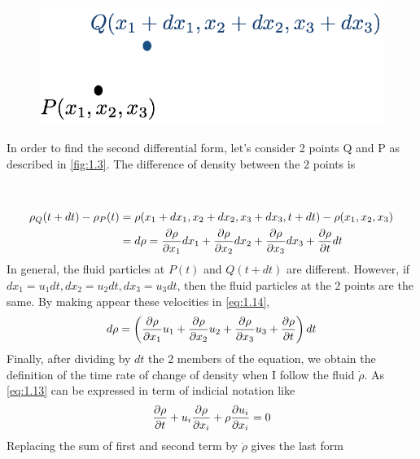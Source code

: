 	\begin{figure}
	\vspace{-5mm}
	\includegraphics[scale=0.35]{ch1/3}
	\label{fig:1.3}
	\end{figure}
	In order to find the second differential form, let's consider 2 points Q and P as described in \autoref{fig:1.3}. The difference of density between the 2 points is \\\\\\
	\begin{equation}
	\begin{aligned}
		\rho _Q(t+dt) - \rho _P(t) &= \rho (x_1+dx_1,x_2+dx_2,x_3+dx_3,t+dt) - \rho (x_1,x_2,x_3)  \\
		&= d\rho = \frac{\D \rho}{\D x_1}dx_1 + \frac{\D \rho}{\D x_2}dx_2 + \frac{\D \rho}{\D x_3}dx_3 + \frac{\D \rho}{\D t}dt
		\end{aligned}
		\label{eq:1.14}
	\end{equation}
	In general, the fluid particles at $P(t)$ and $Q(t+dt)$ are different. However, if $dx_1 = u_1 dt, dx_2 = u_2 dt, dx_3 = u_3 dt$, then the fluid particles at the 2 points are the same. By making appear these velocities in \autoref{eq:1.14}, 
	\begin{equation}
		d\rho = \left( \frac{\D \rho}{\D x_1}u_1 + \frac{\D \rho}{\D x_2}u_2 + \frac{\D \rho}{\D x_3}u_3 + \frac{\D \rho}{\D t}\right) dt
	\end{equation}
	Finally, after dividing by $dt$ the 2 members of the equation, we obtain the definition of the time rate of change of density when I follow the fluid $\dot{\rho}$. As \autoref{eq:1.13} can be expressed in term of indicial notation like 
	\begin{equation}
		\frac{\D \rho}{\D t} + u_i \frac{\D\rho}{\D x_i} + \rho \frac{\D u_i}{\D x_i} = 0 
	\end{equation}
	Replacing the sum of first and second term by $\dot{\rho}$ gives the last form
	\begin{center}
	\end{center}
	
